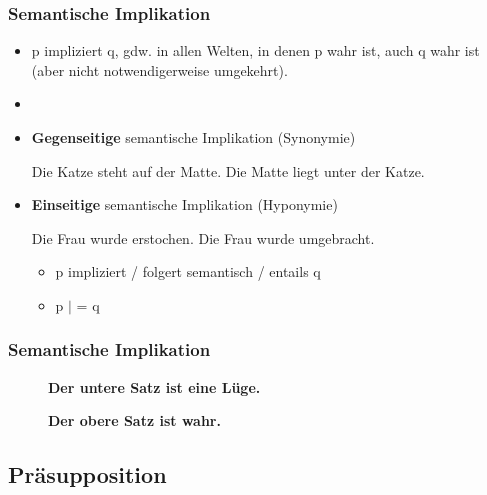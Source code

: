 
\begin{frame}
\frametitle{Semantische Implikation}

\begin{itemize}
	\item p impliziert q, gdw. in allen Welten, in denen p wahr ist, auch q wahr ist (aber nicht notwendigerweise umgekehrt).
	\item[]
	\item \textbf{Gegenseitige} semantische Implikation (\ras Synonymie)
	
	\eal
		\ex Die Katze steht auf der Matte.
		\ex Die Matte liegt unter der Katze.
	\zl
	
	\item \textbf{Einseitige} semantische Implikation (\ras Hyponymie)
	
	\eal
		\ex Die Frau wurde erstochen.
		\ex Die Frau wurde umgebracht.
	\zl
	
	\begin{itemize}
		\item p impliziert / folgert semantisch / entails q
		\item p $|$ = q
	\end{itemize}
	
\end{itemize}

\end{frame}



\begin{frame}
\frametitle{Semantische Implikation}

\begin{figure}
	\centering
	\LARGE
	
\textbf{	Der untere Satz ist eine Lüge.}

\vspace{2cm}

\textbf{Der obere Satz ist wahr.}

\end{figure}
%
%

\end{frame}


%
\subsection{Präsupposition}
%

